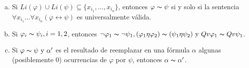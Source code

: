   \begin{lemma} \label{lemma_47}
    \PN \newline
    \begin{enumerate}[(a)]
      \item Si $Li(\varphi) \cup Li(\psi) \subseteq \{x_{i_{1}}, \dotsc, x_{i_{n}}\}$, entonces $\varphi \thicksim \psi$
      si y solo si la sentencia $\forall x_{i_{1}} \dotsc \forall x_{i_{n}}(\varphi \leftrightarrow \psi)$ es
      universalmente válida.
      \item Si $\varphi_{i} \thicksim \psi_{i}, i = 1, 2$, entonces $\lnot \varphi_{1} \thicksim \lnot \psi_{1},
      (\varphi_{1} \eta \varphi_{2}) \thicksim (\psi_{1} \eta \psi_{2}) \ \text{y} \ Qv\varphi_{1} \thicksim Qv \psi_{1}$.
      \item Si $\varphi \thicksim \psi \ \text{y} \ \alpha^{\prime}$ es el resultado de reemplazar en una fórmula $\alpha$
      algunas (posiblemente $0$) ocurrencias de $\varphi$ por $\psi$, entonces $\alpha \thicksim \alpha^{\prime}$.
    \end{enumerate}
  \end{lemma}
